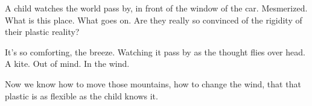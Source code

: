 

A child watches the world pass by, in front of the window of the car.
Mesmerized.  What is this place.  What goes on.  Are they really so
convinced of the rigidity of their plastic reality?

It's so comforting, the breeze.  Watching it pass by as the thought
flies over head.  A kite.  Out of mind.  In the wind.

Now we know how to move those mountains, how to change the wind, that
that plastic is as flexible as the child knows it.

\bye
